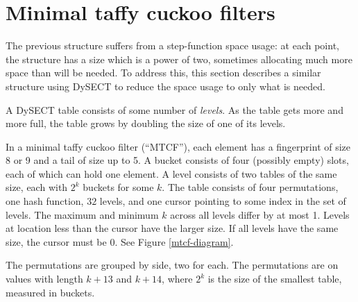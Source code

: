 \documentclass[manuscript,screen,review]{acmart}
\begin{document}


\section{Minimal taffy cuckoo filters}
\label{mtcf}

The previous structure suffers from a step-function space usage:
at each point, the structure has a size which is a power of two, sometimes allocating much more space than will be needed.
To address this, this section describes a similar structure using DySECT to reduce the space usage to only what is needed.~\cite{dysect}

A DySECT table consists of some number of {\em levels}.
As the table gets more and more full, the table grows by doubling the size of one of its levels.

In a minimal taffy cuckoo filter (``MTCF''), each element has a fingerprint of size 8 or 9 and a tail of size up to 5.
A bucket consists of four (possibly empty) slots, each of which can hold one element.
A level consists of two tables of the same size, each with $2^k$ buckets for some $k$.
The table consists of four permutations, one hash function, $32$ levels, and one cursor pointing to some index in the set of levels.
The maximum and minimum $k$ across all levels differ by at most 1.
Levels at location less than the cursor have the larger size.
If all levels have the same size, the cursor must be 0.
See Figure \ref{mtcf-diagram}.

The permutations are grouped by side, two for each.
The permutations are on values with length $k + 13$ and $k + 14$, where $2^k$ is the size of the smallest table, measured in buckets.
\end{document}

